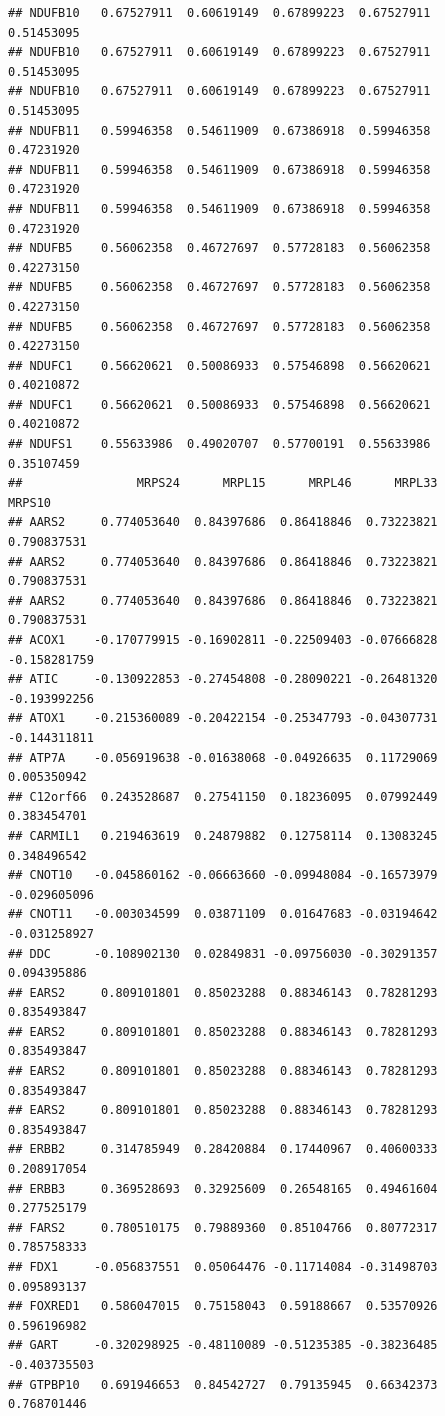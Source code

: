 \documentclass[
]{article}
\begin{document}
\begin{verbatim}
## NDUFB10   0.67527911  0.60619149  0.67899223  0.67527911  0.51453095
## NDUFB10   0.67527911  0.60619149  0.67899223  0.67527911  0.51453095
## NDUFB10   0.67527911  0.60619149  0.67899223  0.67527911  0.51453095
## NDUFB11   0.59946358  0.54611909  0.67386918  0.59946358  0.47231920
## NDUFB11   0.59946358  0.54611909  0.67386918  0.59946358  0.47231920
## NDUFB11   0.59946358  0.54611909  0.67386918  0.59946358  0.47231920
## NDUFB5    0.56062358  0.46727697  0.57728183  0.56062358  0.42273150
## NDUFB5    0.56062358  0.46727697  0.57728183  0.56062358  0.42273150
## NDUFB5    0.56062358  0.46727697  0.57728183  0.56062358  0.42273150
## NDUFC1    0.56620621  0.50086933  0.57546898  0.56620621  0.40210872
## NDUFC1    0.56620621  0.50086933  0.57546898  0.56620621  0.40210872
## NDUFS1    0.55633986  0.49020707  0.57700191  0.55633986  0.35107459
##                MRPS24      MRPL15      MRPL46      MRPL33       MRPS10
## AARS2     0.774053640  0.84397686  0.86418846  0.73223821  0.790837531
## AARS2     0.774053640  0.84397686  0.86418846  0.73223821  0.790837531
## AARS2     0.774053640  0.84397686  0.86418846  0.73223821  0.790837531
## ACOX1    -0.170779915 -0.16902811 -0.22509403 -0.07666828 -0.158281759
## ATIC     -0.130922853 -0.27454808 -0.28090221 -0.26481320 -0.193992256
## ATOX1    -0.215360089 -0.20422154 -0.25347793 -0.04307731 -0.144311811
## ATP7A    -0.056919638 -0.01638068 -0.04926635  0.11729069  0.005350942
## C12orf66  0.243528687  0.27541150  0.18236095  0.07992449  0.383454701
## CARMIL1   0.219463619  0.24879882  0.12758114  0.13083245  0.348496542
## CNOT10   -0.045860162 -0.06663660 -0.09948084 -0.16573979 -0.029605096
## CNOT11   -0.003034599  0.03871109  0.01647683 -0.03194642 -0.031258927
## DDC      -0.108902130  0.02849831 -0.09756030 -0.30291357  0.094395886
## EARS2     0.809101801  0.85023288  0.88346143  0.78281293  0.835493847
## EARS2     0.809101801  0.85023288  0.88346143  0.78281293  0.835493847
## EARS2     0.809101801  0.85023288  0.88346143  0.78281293  0.835493847
## EARS2     0.809101801  0.85023288  0.88346143  0.78281293  0.835493847
## ERBB2     0.314785949  0.28420884  0.17440967  0.40600333  0.208917054
## ERBB3     0.369528693  0.32925609  0.26548165  0.49461604  0.277525179
## FARS2     0.780510175  0.79889360  0.85104766  0.80772317  0.785758333
## FDX1     -0.056837551  0.05064476 -0.11714084 -0.31498703  0.095893137
## FOXRED1   0.586047015  0.75158043  0.59188667  0.53570926  0.596196982
## GART     -0.320298925 -0.48110089 -0.51235385 -0.38236485 -0.403735503
## GTPBP10   0.691946653  0.84542727  0.79135945  0.66342373  0.768701446

\end{verbatim}
\end{document}
